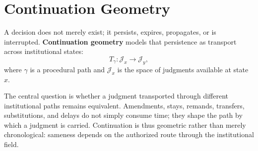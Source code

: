 
\chapter{Continuation Geometry}
\label{ch:ch051}

A decision does not merely exist; it persists, expires, propagates, or is interrupted. \textbf{Continuation geometry} models that persistence as transport across institutional states:
\[
T_{\gamma}:\mathcal J_x\to\mathcal J_y,
\]
where \(\gamma\) is a procedural path and \(\mathcal J_x\) is the space of judgments available at state \(x\).

The central question is whether a judgment transported through different institutional paths remains equivalent. Amendments, stays, remands, transfers, substitutions, and delays do not simply consume time; they shape the path by which a judgment is carried. Continuation is thus geometric rather than merely chronological: sameness depends on the authorized route through the institutional field.

